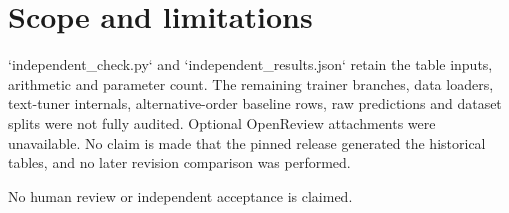 \documentclass[10pt]{article}
\begin{document}
\section*{Scope and limitations}
`independent\_check.py` and `independent\_results.json` retain the table inputs, arithmetic and parameter count. The remaining trainer branches, data loaders, text-tuner internals, alternative-order baseline rows, raw predictions and dataset splits were not fully audited. Optional OpenReview attachments were unavailable. No claim is made that the pinned release generated the historical tables, and no later revision comparison was performed.\par
No human review or independent acceptance is claimed.\par
\end{document}
